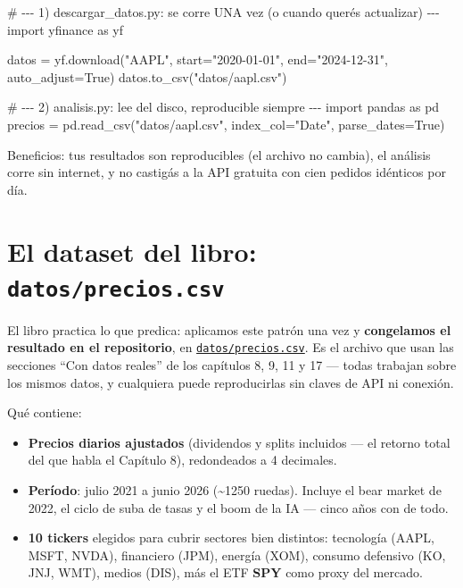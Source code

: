 \documentclass[
  spanish,
  letterpaper,
  DIV=11,
  numbers=noendperiod]{scrreprt}
\newenvironment{Shaded}{\begin{snugshade}}{\end{snugshade}}
\newcommand{\CommentTok}[1]{\textcolor[rgb]{0.37,0.37,0.37}{#1}}
\newcommand{\ImportTok}[1]{\textcolor[rgb]{0.00,0.46,0.62}{#1}}
\newcommand{\NormalTok}[1]{\textcolor[rgb]{0.00,0.23,0.31}{#1}}
\newcommand{\OperatorTok}[1]{\textcolor[rgb]{0.37,0.37,0.37}{#1}}
\newcommand{\StringTok}[1]{\textcolor[rgb]{0.13,0.47,0.30}{#1}}
\newcommand{\VariableTok}[1]{\textcolor[rgb]{0.07,0.07,0.07}{#1}}
\providecommand{\tightlist}{%
  \setlength{\itemsep}{0pt}\setlength{\parskip}{0pt}}
\begin{document}
\begin{Shaded}
\begin{Highlighting}[]
\CommentTok{\# {-}{-}{-} 1) descargar\_datos.py: se corre UNA vez (o cuando querés actualizar) {-}{-}{-}}
\ImportTok{import}\NormalTok{ yfinance }\ImportTok{as}\NormalTok{ yf}

\NormalTok{datos }\OperatorTok{=}\NormalTok{ yf.download(}\StringTok{"AAPL"}\NormalTok{, start}\OperatorTok{=}\StringTok{"2020{-}01{-}01"}\NormalTok{, end}\OperatorTok{=}\StringTok{"2024{-}12{-}31"}\NormalTok{, auto\_adjust}\OperatorTok{=}\VariableTok{True}\NormalTok{)}
\NormalTok{datos.to\_csv(}\StringTok{"datos/aapl.csv"}\NormalTok{)}

\CommentTok{\# {-}{-}{-} 2) analisis.py: lee del disco, reproducible siempre {-}{-}{-}}
\ImportTok{import}\NormalTok{ pandas }\ImportTok{as}\NormalTok{ pd}
\NormalTok{precios }\OperatorTok{=}\NormalTok{ pd.read\_csv(}\StringTok{"datos/aapl.csv"}\NormalTok{, index\_col}\OperatorTok{=}\StringTok{"Date"}\NormalTok{, parse\_dates}\OperatorTok{=}\VariableTok{True}\NormalTok{)}
\end{Highlighting}
\end{Shaded}

Beneficios: tus resultados son reproducibles (el archivo no cambia), el
análisis corre sin internet, y no castigás a la API gratuita con cien
pedidos idénticos por día.

\section{\texorpdfstring{El dataset del libro:
\texttt{datos/precios.csv}}{El dataset del libro: datos/precios.csv}}\label{el-dataset-del-libro-datosprecios.csv}

El libro practica lo que predica: aplicamos este patrón una vez y
\textbf{congelamos el resultado en el repositorio}, en
\href{https://github.com/diegoonna/libro_finanzas_computacionales/blob/main/datos/precios.csv}{\texttt{datos/precios.csv}}.
Es el archivo que usan las secciones ``Con datos reales'' de los
capítulos 8, 9, 11 y 17 --- todas trabajan sobre los mismos datos, y
cualquiera puede reproducirlas sin claves de API ni conexión.

Qué contiene:

\begin{itemize}
\tightlist
\item
  \textbf{Precios diarios ajustados} (dividendos y splits incluidos ---
  el retorno total del que habla el Capítulo 8), redondeados a 4
  decimales.
\item
  \textbf{Período}: julio 2021 a junio 2026 (\textasciitilde1250
  ruedas). Incluye el bear market de 2022, el ciclo de suba de tasas y
  el boom de la IA --- cinco años con de todo.
\item
  \textbf{10 tickers} elegidos para cubrir sectores bien distintos:
  tecnología (AAPL, MSFT, NVDA), financiero (JPM), energía (XOM),
  consumo defensivo (KO, JNJ, WMT), medios (DIS), más el ETF
  \textbf{SPY} como proxy del mercado.
\end{itemize}
\end{document}
